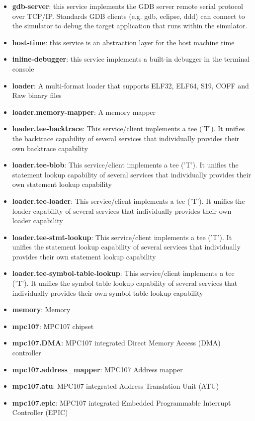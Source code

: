 \begin{itemize}
\item \textbf{gdb-server}: this service implements the GDB server remote serial protocol over TCP/IP. Standards GDB clients (e.g. gdb, eclipse, ddd) can connect to the simulator to debug the target application that runs within the simulator.
\item \textbf{host-time}: this service is an abstraction layer for the host machine time
\item \textbf{inline-debugger}: this service implements a built-in debugger in the terminal console
\item \textbf{loader}: A multi-format loader that supports ELF32, ELF64, S19, COFF and Raw binary files
\item \textbf{loader.memory-mapper}: A memory mapper
\item \textbf{loader.tee-backtrace}: This service/client implements a tee ('T'). It unifies the backtrace capability of several services that individually provides their own backtrace capability
\item \textbf{loader.tee-blob}: This service/client implements a tee ('T'). It unifies the statement lookup capability of several services that individually provides their own statement lookup capability
\item \textbf{loader.tee-loader}: This service/client implements a tee ('T'). It unifies the loader capability of several services that individually provides their own loader capability
\item \textbf{loader.tee-stmt-lookup}: This service/client implements a tee ('T'). It unifies the statement lookup capability of several services that individually provides their own statement lookup capability
\item \textbf{loader.tee-symbol-table-lookup}: This service/client implements a tee ('T'). It unifies the symbol table lookup capability of several services that individually provides their own symbol table lookup capability
\item \textbf{memory}: Memory
\item \textbf{mpc107}: MPC107 chipset
\item \textbf{mpc107.DMA}: MPC107 integrated Direct Memory Access (DMA) controller
\item \textbf{mpc107.address\_mapper}: MPC107 Address mapper
\item \textbf{mpc107.atu}: MPC107 integrated Address Translation Unit (ATU)
\item \textbf{mpc107.epic}: MPC107 integrated Embedded Programmable Interrupt Controller (EPIC)

\end{itemize}
